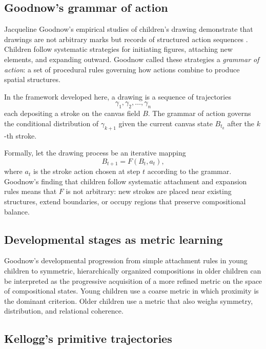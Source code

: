 \documentclass[12pt,a4paper]{article}
\theoremstyle{plain}
\theoremstyle{definition}
\begin{document}
\subsection{Goodnow's grammar of action}

Jacqueline Goodnow's empirical studies of children's drawing demonstrate that
drawings are not arbitrary marks but records of structured action sequences
\cite{goodnow1977}. Children follow systematic strategies for initiating
figures, attaching new elements, and expanding outward. Goodnow called these
strategies a \emph{grammar of action}: a set of procedural rules governing how
actions combine to produce spatial structures.

In the framework developed here, a drawing is a sequence of trajectories
\[
\gamma_1, \gamma_2, \dots, \gamma_n
\]
each depositing a stroke on the canvas field $B$. The grammar of action governs
the conditional distribution of $\gamma_{k+1}$ given the current canvas state
$B_{t_k}$ after the $k$-th stroke.

Formally, let the drawing process be an iterative mapping
\[
B_{t+1} = F(B_t, a_t),
\]
where $a_t$ is the stroke action chosen at step $t$ according to the grammar.
Goodnow's finding that children follow systematic attachment and expansion rules
means that $F$ is not arbitrary: new strokes are placed near existing structures,
extend boundaries, or occupy regions that preserve compositional balance.

\subsection{Developmental stages as metric learning}

Goodnow's developmental progression from simple attachment rules in young
children to symmetric, hierarchically organized compositions in older children
can be interpreted as the progressive acquisition of a more refined metric on
the space of compositional states. Young children use a coarse metric in which
proximity is the dominant criterion. Older children use a metric that also weighs
symmetry, distribution, and relational coherence.

\subsection{Kellogg's primitive trajectories}
\end{document}
